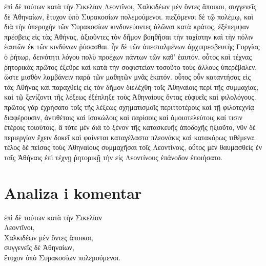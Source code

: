 {\large

\begin{greek}

\noindent ἐπὶ δὲ τούτων κατὰ τὴν Σικελίαν Λεοντῖνοι, Χαλκιδέων μὲν ὄντες ἄποικοι, συγγενεῖς δὲ Ἀθηναίων, ἔτυχον ὑπὸ Συρακοσίων πολεμούμενοι. πιεζόμενοι δὲ τῷ πολέμῳ, καὶ διὰ τὴν ὑπεροχὴν τῶν Συρακοσίων κινδυνεύοντες ἁλῶναι κατὰ κράτος, ἐξέπεμψαν πρέσβεις εἰς τὰς Ἀθήνας, ἀξιοῦντες τὸν δῆμον βοηθῆσαι τὴν ταχίστην καὶ τὴν πόλιν ἑαυτῶν ἐκ τῶν κινδύνων ῥύσασθαι. ἦν δὲ τῶν ἀπεσταλμένων ἀρχιπρεσβευτὴς Γοργίας ὁ ῥήτωρ, δεινότητι λόγου πολὺ προέχων πάντων τῶν καθ' ἑαυτόν. οὗτος καὶ τέχνας ῥητορικὰς πρῶτος ἐξεῦρε καὶ κατὰ τὴν σοφιστείαν τοσοῦτο τοὺς ἄλλους ὑπερέβαλεν, ὥστε μισθὸν λαμβάνειν παρὰ τῶν μαθητῶν μνᾶς ἑκατόν. οὗτος οὖν καταντήσας εἰς τὰς Ἀθήνας καὶ παραχθεὶς εἰς τὸν δῆμον διελέχθη τοῖς Ἀθηναίοις περὶ τῆς συμμαχίας, καὶ τῷ ξενίζοντι τῆς λέξεως ἐξέπληξε τοὺς Ἀθηναίους ὄντας εὐφυεῖς καὶ φιλολόγους. πρῶτος γὰρ ἐχρήσατο τοῖς τῆς λέξεως σχηματισμοῖς περιττοτέροις καὶ τῇ φιλοτεχνίᾳ διαφέρουσιν, ἀντιθέτοις καὶ ἰσοκώλοις καὶ παρίσοις καὶ ὁμοιοτελεύτοις καί τισιν ἑτέροις τοιούτοις, ἃ τότε μὲν διὰ τὸ ξένον τῆς κατασκευῆς ἀποδοχῆς ἠξιοῦτο, νῦν δὲ περιεργίαν ἔχειν δοκεῖ καὶ φαίνεται καταγέλαστα πλεονάκις καὶ κατακόρως τιθέμενα. τέλος δὲ πείσας τοὺς Ἀθηναίους συμμαχῆσαι τοῖς Λεοντίνοις, οὗτος μὲν θαυμασθεὶς ἐν ταῖς Ἀθήναις ἐπὶ τέχνῃ ῥητορικῇ τὴν εἰς Λεοντίνους ἐπάνοδον ἐποιήσατο.

\end{greek}

}

\newpage
\section*{Analiza i komentar}



{\large
\begin{greek}
\noindent ἐπὶ δὲ τούτων κατὰ τὴν Σικελίαν\\
Λεοντῖνοι,\\
\tabto{2em} Χαλκιδέων μὲν ὄντες ἄποικοι,\\
\tabto{2em} συγγενεῖς δὲ Ἀθηναίων,\\
ἔτυχον ὑπὸ Συρακοσίων πολεμούμενοι.\\

\end{greek}
}


